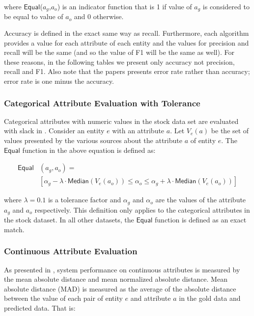 \documentclass{acm_proc_article-sp}
\begin{document}
where $\mathsf{Equal}$($a_g$,$a_o$) is an indicator function that is 1 if value of $a_g$ is considered to be equal to value of $a_o$  and 0 otherwise.


Accuracy is defined in the exact same way as recall. Furthermore, each algorithm  provides a value for each attribute of each entity and the values for precision and recall will be the same (and so the value of F1 will be the same as well). For these reasons, in the following tables we present only accuracy not precision, recall and F1. Also note that the papers \cite{li:resolving} presents error rate rather than accuracy; error rate is one minus the accuracy. 

\subsubsection{Categorical Attribute Evaluation with Tolerance}

Categorical attributes with numeric values in the stock data set are evaluated with slack in \cite{li:truth}. Consider an entity $e$ with an attribute $a$. Let $V_e(a)$ be the set of values presented by the various sources about the attribute $a$ of entity $e$. The $\mathsf{Equal}$ function in the above equation is defined as:

\begin{align}
\mathsf{Equal}&(a_g,a_o) =\\ \nonumber
&[\alpha_g - \lambda \cdot  \mathsf{Median}(V_e(a_o)) \leq \alpha_o \leq \alpha_g + \lambda \cdot  \mathsf{Median}(V_e(a_o))]
\end{align}

where $\lambda = 0.1$ is a tolerance factor and $\alpha_g$ and $\alpha_o$ are the values of the attribute $a_g$ and $a_o$ respectively. This definition only applies to the categorical attributes in the stock dataset. In all other datasets, the $\mathsf{Equal}$ function is defined as an exact match.

\subsubsection{Continuous Attribute Evaluation}

As presented in \cite{li:resolving}, system performance on continuous attributes is measured by the mean absolute distance and mean normalized absolute distance. Mean absolute distance (MAD) is measured as the average of the absolute distance between the value of each pair of entity $e$ and attribute $a$ in the gold data and predicted data. That is:
\end{document}
